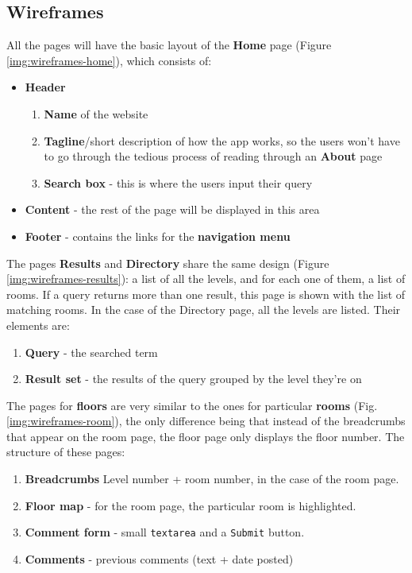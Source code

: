 \documentclass{sig-alt-release2}
\begin{document}
\subsection*{Wireframes}
All the pages will have the basic layout of the \textbf{Home} page
(Figure \ref{img:wireframes-home}), which consists of:
\begin{itemize}
	\item{
		\textbf{Header}
		\begin{enumerate}
			\item{
				\textbf{Name} of the website
			}
			\item{
				\textbf{Tagline}/short description of how the app works, so
				the users won't have to go through the tedious process of
				reading through an \textbf{About} page
			}
			\item{
				\textbf{Search box} - this is where the users input their
				query
			}
		\end{enumerate}
	}

	\item{
		\textbf{Content} - the rest of the page will be displayed in this area
	}
	
	\item{\textbf{Footer} - contains the links for the \textbf{navigation menu}
	}
\end{itemize}


The pages \textbf{Results} and \textbf{Directory} share the same design (Figure 
\ref{img:wireframes-results}): a list of all the levels, and for each one of 
them, a list of rooms. If a query returns more than one result, this page is 
shown with the list of matching rooms. In the case of the Directory page, all 
the levels are listed. Their elements are:
\begin{enumerate}
	\item{\textbf{Query} - the searched term}
	\item{\textbf{Result set} - the results of the query grouped by the level
	they're on}
\end{enumerate}


The pages for \textbf{floors} are very similar to the ones for particular
\textbf{rooms} (Fig. \ref{img:wireframes-room}), the only difference being that
instead of the breadcrumbs that appear on the room page, the floor page only 
displays the floor number. The structure of these pages:
\begin{enumerate}
	\item{\textbf{Breadcrumbs} Level number + room number, in the case of 
	the room page.}
	\item{\textbf{Floor map} - for the room page, the particular room is
	highlighted.}
	\item{\textbf{Comment form} - small \texttt{textarea} and a 
	\texttt{Submit} button.}
	\item{\textbf{Comments} - previous comments (text + date posted)}
\end{enumerate}
\end{document}
